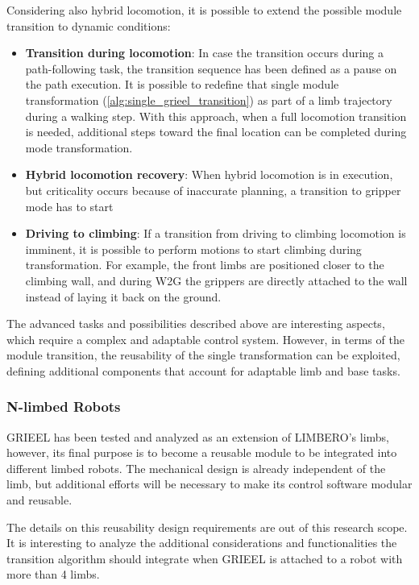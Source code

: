 Considering also hybrid locomotion, it is possible to extend the possible module transition to dynamic conditions: 
\begin{itemize}
    \setlength\itemsep{-0.7em} 
    \item \textbf{Transition during locomotion}: In case the transition occurs during a path-following task, the transition sequence has been defined as a pause on the path execution. It is possible to redefine that single module transformation (\ref{alg:single_grieel_transition}) as part of a limb trajectory during a walking step. With this approach, when a full locomotion transition is needed, additional steps toward the final location can be completed during mode transformation.  \item \textbf{Hybrid locomotion recovery}: When hybrid locomotion is in execution, but criticality occurs because of inaccurate planning, a transition to gripper mode has to start
    \item  \textbf{Driving to climbing}: If a transition from driving to climbing locomotion is imminent, it is possible to perform motions to start climbing during transformation. For example, the front limbs are positioned closer to the climbing wall, and during W2G the grippers are directly attached to the wall instead of laying it back on the ground. 
\end{itemize}

The advanced tasks and possibilities described above are interesting aspects, which require a complex and adaptable control system. 
However,  in terms of the module transition, the reusability of the single transformation can be exploited, defining additional components that account for adaptable limb and base tasks. 

\subsubsection{N-limbed Robots}
\label{sec:N_limbed_extension}

GRIEEL has been tested and analyzed as an extension of LIMBERO's limbs, however, its final purpose is to become a reusable module to be integrated into different limbed robots. The mechanical design is already independent of the limb, but additional efforts will be necessary to make its control software modular and reusable.

The details on this reusability design requirements are out of this research scope. It is interesting to analyze the additional considerations and functionalities the transition algorithm should integrate when GRIEEL is attached to a robot with more than 4 limbs. 


